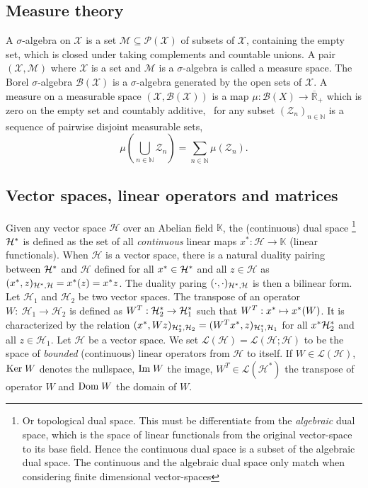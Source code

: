 \subsection{Measure theory}
A $\sigma$-algebra on $\mathcal{X}$ is a set $\mathcal{M}\subseteq\mathcal{P}(\mathcal{X})$ of subsets of $\mathcal{X}$, containing the empty set, which is closed under taking complements and countable unions. A pair $(\mathcal{X},\mathcal{M})$ where $\mathcal{X}$ is a set and $\mathcal{M}$ is a $\sigma$-algebra is called a measure space. The Borel $\sigma$-algebra $\mathcal{B}(\mathcal{X})$ is a $\sigma$-algebra generated by the open sets of $\mathcal{X}$. A measure on a measurable space $(\mathcal{X},\mathcal{B}(\mathcal{X}))$ is a map $\mu: \mathcal{B}(X) \to \overline{\mathbb{R}}_+$ which is zero on the empty set and countably additive, \ie~for any subset $(\mathcal{Z}_n)_{n\in\mathbb{N}}$ is a sequence of pairwise disjoint measurable sets,
\begin{dmath*}
\mu\left(\bigcup_{n\in\mathbb{N}}\mathcal{Z}_n\right)=\sum_{n\in\mathbb{N}}\mu(\mathcal{Z}_n).
\end{dmath*}

\subsection{Vector spaces, linear operators and matrices}
Given any vector space $\mathcal{H}$ over an Abelian field $\mathbb{K}$, the (continuous) dual space \footnote{Or topological dual space. This must be differentiate from the \emph{algebraic} dual space, which is the space of linear functionals from the original vector-space to its base field. Hence the continuous dual space is a subset of the algebraic dual space. The continuous and the algebraic dual space only match when considering finite dimensional vector-spaces} $\mathcal{H}^*$ is defined as the set of all \emph{continuous} linear maps $x^*: \mathcal{H} \to \mathbb{K}$ (linear functionals). When $\mathcal{H}$ is a vector space, there is a natural duality pairing between $\mathcal{H}^*$ and $\mathcal{H}$ defined for all $x^*\in\mathcal{H}^*$ and all $z\in\mathcal{H}$ as $(x^*, z)_{\mathcal{H}^*,\mathcal{H}}=x^*(z)=x^* z$. The duality paring $(\cdot, \cdot)_{\mathcal{H}^*,\mathcal{H}}$ is then a bilinear form. Let $\mathcal{H}_1$ and $\mathcal{H}_2$ be two vector spaces. The transpose of an operator $W:~\mathcal{H}_1\to\mathcal{H}_2$ is defined as $W^T:\mathcal{H}_2^* \to \mathcal{H}_1^*$ such that $W^T:x^*\mapsto x^*(W)$. It is characterized by the relation $(x^*, Wz)_{\mathcal{H}_2^*,\mathcal{H}_2}=(W^Tx^*, z)_{\mathcal{H}_1^*,\mathcal{H}_1}$ for all $x^*\mathcal{H}_2^*$ and all $z\in\mathcal{H}_1$. Let $\mathcal{H}$ be a vector space. We set $\mathcal{L}(\mathcal{H})=\mathcal{L}(\mathcal{H};\mathcal{H})$ to be the space of \emph{bounded} (continuous) linear operators from $\mathcal{H}$ to itself. If $W\in\mathcal{L}(\mathcal{H})$, $\text{Ker}\; W$ denotes the nullspace, $\text{Im}\; W$ the image, $W^T \in \mathcal{L}(\mathcal{H}^*)$ the transpose of operator $W$ and $\text{Dom}\; W$ the domain of $W$.

